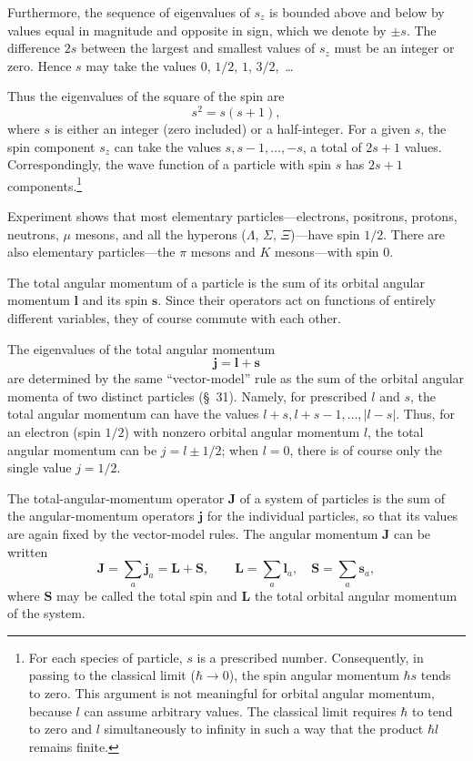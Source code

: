 Furthermore, the sequence of eigenvalues of $s_z$ is bounded above and below
by values equal in magnitude and opposite in sign, which we denote by
$\pm s$. The difference $2s$ between the largest and smallest values of $s_z$
must be an integer or zero. Hence $s$ may take the values $0$, $1/2$, $1$,
$3/2$,~\dots

Thus the eigenvalues of the square of the spin are
\begin{equation}
 s^2=s(s+1),
 \tag{54.2}
\end{equation}
where $s$ is either an integer (zero included) or a half-integer. For a given
$s$, the spin component $s_z$ can take the values
$s,s-1,\ldots,-s$, a total of $2s+1$ values. Correspondingly, the wave
function of a particle with spin $s$ has $2s+1$ components.\footnote{For each
species of particle, $s$ is a prescribed number. Consequently, in passing to
the classical limit ($\hbar\to0$), the spin angular momentum $\hbar s$ tends
to zero. This argument is not meaningful for orbital angular momentum,
because $l$ can assume arbitrary values. The classical limit requires
$\hbar$ to tend to zero and $l$ simultaneously to infinity in such a way
that the product $\hbar l$ remains finite.}

Experiment shows that most elementary particles---electrons, positrons,
protons, neutrons, $\mu$ mesons, and all the hyperons ($\Lambda$, $\Sigma$,
$\Xi$)---have spin $1/2$. There are also elementary particles---the $\pi$
mesons and $K$ mesons---with spin $0$.

The total angular momentum of a particle is the sum of its orbital angular
momentum $\mathbf l$ and its spin $\mathbf s$. Since their operators act on
functions of entirely different variables, they of course commute with each
other.

The eigenvalues of the total angular momentum
\begin{equation}
 \mathbf j=\mathbf l+\mathbf s
 \tag{54.3}
\end{equation}
are determined by the same ``vector-model'' rule as the sum of the orbital
angular momenta of two distinct particles (\S~31). Namely, for prescribed
$l$ and $s$, the total angular momentum can have the values
$l+s,l+s-1,\ldots,|l-s|$. Thus, for an electron (spin $1/2$) with nonzero
orbital angular momentum $l$, the total angular momentum can be
$j=l\pm1/2$; when $l=0$, there is of course only the single value $j=1/2$.

The total-angular-momentum operator $\mathbf J$ of a system of particles is
the sum of the angular-momentum operators $\mathbf j$ for the individual
particles, so that its values are again fixed by the vector-model rules. The
angular momentum $\mathbf J$ can be written
\begin{equation}
 \mathbf J=\sum_a\mathbf j_a=\mathbf L+\mathbf S,
 \qquad \mathbf L=\sum_a\mathbf l_a,\quad
 \mathbf S=\sum_a\mathbf s_a,
 \tag{54.4}
\end{equation}
where $\mathbf S$ may be called the total spin and $\mathbf L$ the total
orbital angular momentum of the system.

